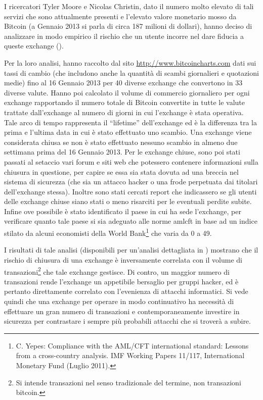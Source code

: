 I ricercatori Tyler Moore e Nicolas Christin, dato il numero molto elevato di tali servizi che sono attualmente presenti e l'elevato valore monetario mosso da Bitcoin (a Gennaio 2013 si parla di circa 187 milioni di dollari), hanno deciso di analizzare in modo empirico il rischio che un utente incorre nel dare fiducia a queste exchange (\cite{middleman}).

Per la loro analisi, hanno raccolto dal sito \url{http://www.bitcoincharts.com} dati sui tassi di cambio (che includono anche la quantità di scambi giornalieri e quotazioni medie) fino al 16 Gennaio 2013 per 40 diverse exchange che convertono in 33 diverse valute.
Hanno poi calcolato il volume di commercio giornaliero per ogni exchange rapportando il numero totale di Bitcoin convertite in tutte le valute trattate dall'exchange al numero di giorni in cui l'exchange è stata operativa. Tale arco di tempo rappresenta il ``lifetime'' dell'exchange ed è la differenza tra la prima e l'ultima data in cui è stato effettuato uno scambio. Una exchange viene considerata chiusa se non è stato effettuato nessuno scambio in almeno due settimana prima del 16 Gennaio 2013.
Per le exchange chiuse, sono poi stati passati al setaccio vari forum e siti web che potessero contenere informazioni sulla chiusura in questione, per capire se essa sia stata dovuta ad una breccia nel sistema di sicurezza (che sia un attacco hacker o una frode perpetuata dai titolari dell'exchange stessa). Inoltre sono stati cercati report che indicassero se gli utenti delle exchange chiuse siano stati o meno risarciti per le eventuali perdite subite.
Infine ove possibile è stato identificato il paese in cui ha sede l'exchange, per verificare quanto tale paese si sia adeguato alle norme \gls{amlcft} in base ad un indice stilato da alcuni economisti della World Bank\footnote{C. Yepes: Compliance with the AML/CFT international standard: Lessons from a cross-country analysis. IMF Working Papers 11/117, International Monetary Fund (Luglio 2011).} che varia da 0 a 49.

I risultati di tale analisi (disponibili per un'analisi dettagliata in \cite{middleman}) mostrano che il rischio di chiusura di una exchange è inversamente correlata con il volume di transazioni\footnote{Si intende transazioni nel senso tradizionale del termine, non transazioni bitcoin.} che tale exchange gestisce. Di contro, un maggior numero di transazioni rende l'exchange un appetibile bersaglio per gruppi hacker, ed è pertanto direttamente correlato con l'evenienza di attacchi informatici.
Si vede quindi che una exchange per operare in modo continuativo ha necessità di effettuare un gran numero di transazioni e contemporaneamente investire in sicurezza per contrastare i sempre più probabili attacchi che si troverà a subire.
